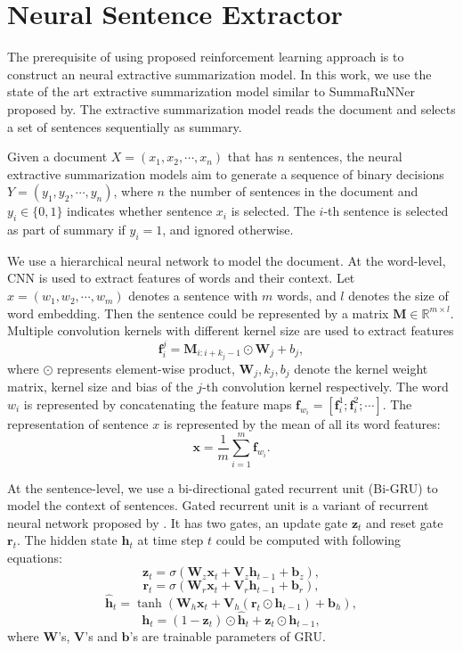 \documentclass[letterpaper]{article} %
\begin{document}
	\section{Neural Sentence Extractor}
	
	The prerequisite of using proposed reinforcement learning approach is to construct an neural extractive summarization model. In this work, we use the state of the art extractive summarization model similar to SummaRuNNer proposed by\cite{SummaRuNNer}. The extractive summarization model reads the document and selects a set of sentences sequentially as summary.  
	
	Given a document $X=(x_1, x_2, \cdots, x_n)$ that has $n$ sentences, the neural extractive summarization models aim to generate a sequence of binary decisions $Y=(y_1, y_2, \cdots, y_n)$, where $n$ the number of sentences in the document and $y_i \in \{0,1\}$ indicates whether sentence $x_i$ is selected. The $i$-th sentence is selected as part of summary if $y_i=1$, and ignored otherwise.
	
	
	We use a hierarchical neural network to model the document. At the word-level, CNN is used to extract features of words and their context. Let $x=(w_1, w_2, \cdots, w_m)$ denotes a sentence with $m$ words, and $l$ denotes the size of word embedding. Then the sentence could be represented by a matrix $\mathbf{M} \in \mathbb{R}^{m \times l}$. Multiple convolution kernels with different kernel size are used to extract features
	$$\mathbf{f}_i^j = \mathbf{M}_{i:i+k_j-1} \odot \mathbf{W}_j + b_j ,$$
	where $\odot$ represents element-wise product, $\mathbf{W}_j, k_j, b_j$ denote the kernel weight matrix, kernel size and bias of the $j$-th convolution kernel respectively. The word $w_i$ is represented by concatenating the feature maps $\mathbf{f}_{w_i}=[\mathbf{f}_i^1 ; \mathbf{f}_i^2 ; \cdots]$. The representation of sentence $x$ is represented by the mean of all its word features:
	$$ \mathbf{x} = \frac{1}{m} \sum_{i=1}^m \mathbf{f}_{w_i} .$$
	
	At the sentence-level, we use a bi-directional gated recurrent unit (Bi-GRU) to model the context of sentences. Gated recurrent unit is a variant of recurrent neural network proposed by \cite{chung2014empirical}. It has two gates, an update gate $\mathbf{z}_t$ and reset gate $\mathbf{r}_t$. The hidden state $\mathbf{h}_t$ at time step $t$ could be computed with following equations:
	\[ \mathbf{z}_t = \sigma(\mathbf{W}_{z} \mathbf{x}_t + \mathbf{V}_{z} \mathbf{h}_{t-1}  + \mathbf{b}_{z}) , \]
	\[ \mathbf{r}_t = \sigma(\mathbf{W}_{r} \mathbf{x}_t + \mathbf{V}_{r} \mathbf{h}_{t-1}  + \mathbf{b}_{r}) , \]
	\[ \hat{\mathbf{h}}_t = \tanh(\mathbf{W}_{h} \mathbf{x}_t + \mathbf{V}_{h} (\mathbf{r}_{t} \odot \mathbf{h}_{t-1} ) + \mathbf{b}_{h} ) ,\]
	\[ \mathbf{h}_t = (1 - \mathbf{z}_t) \odot \hat{\mathbf{h}}_{t} +  \mathbf{z}_t \odot \mathbf{h}_{t-1} ,\]
	where $\mathbf{W}$'s, $\mathbf{V}$'s and $\mathbf{b}$'s are trainable parameters of GRU. 
	
\end{document}
